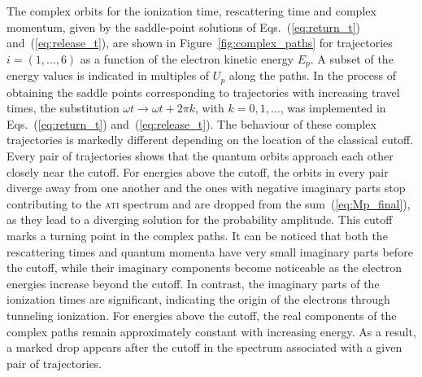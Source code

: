 The complex orbits for the ionization time, rescattering time and
complex momentum, given by the saddle-point solutions of
Eqs.~(\ref{eq:return_t}) and~(\ref{eq:release_t}), are shown in
Figure~\ref{fig:complex_paths} for trajectories $i = (1,\dots,6)$ as a
function of the electron kinetic energy $E_{p}$. A subset of the
energy values is indicated in multiples of $U_{p}$ along the paths. In
the process of obtaining the saddle points corresponding to
trajectories with increasing travel times, the substitution $\omega t
\to \omega t + 2\pi k$, with $k = 0,1,\dots$, was implemented in
Eqs.~(\ref{eq:return_t}) and~(\ref{eq:release_t}). The behaviour of
these complex trajectories is markedly different depending on the
location of the classical cutoff. Every pair of trajectories shows
that the quantum orbits approach each other closely near the
cutoff. For energies above the cutoff, the orbits in every pair
diverge away from one another and the ones with negative imaginary
parts stop contributing to the \textsc{ati} spectrum and are dropped
from the sum~(\ref{eq:Mp_final}), as they lead to a diverging solution
for the probability amplitude. This cutoff marks a turning point in
the complex paths. It can be noticed that both the rescattering times
and quantum momenta have very small imaginary parts before the cutoff,
while their imaginary components become noticeable as the electron
energies increase beyond the cutoff. In contrast, the imaginary parts
of the ionization times are significant, indicating the origin of the
electrons through tunneling ionization. For energies above the cutoff,
the real components of the complex paths remain approximately constant
with increasing energy. As a result, a marked drop appears after the
cutoff in the spectrum associated with a given pair of trajectories.

